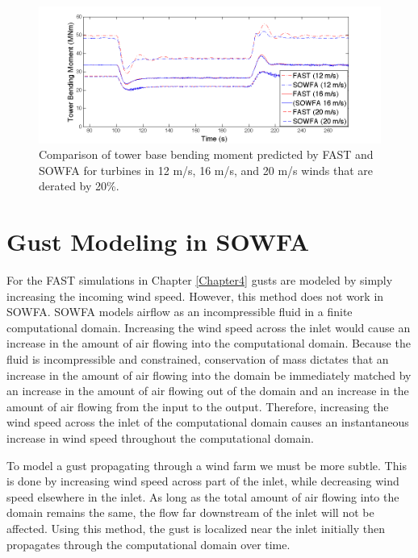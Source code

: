 \begin{figure}[htb]	
	\centering
		\includegraphics[width = .95\linewidth]{Figures/ch6Figures/fig6-6.png}

	\caption{Comparison of tower base bending moment predicted by FAST and SOWFA for turbines in 12 m/s, 16 m/s, and 20 m/s  winds that are derated by 20\%.}
	\label{fig6-6}
\end{figure}


\section{Gust Modeling in SOWFA} \label{section6-5}

For the FAST simulations in Chapter \ref{Chapter4} gusts are modeled by simply increasing the incoming wind speed. However, this method does not work in SOWFA. SOWFA models airflow as an incompressible fluid in a finite computational domain. Increasing the wind speed across the inlet would cause an increase in the amount of air flowing into the computational domain. Because the fluid is incompressible and constrained, conservation of mass dictates that an increase in the amount of air flowing into the domain be immediately matched by an increase in the amount of air flowing out of the domain and an increase in the amount of air flowing from the input to the output. Therefore, increasing the wind speed across the inlet of the computational domain causes an instantaneous increase in wind speed throughout the computational domain.

To model a gust propagating through a wind farm we must be more subtle. This is done by increasing wind speed across part of the inlet, while decreasing wind speed elsewhere in the inlet. As long as the total amount of air flowing into the domain remains the same, the flow far downstream of the inlet will not be affected. Using this method, the gust is localized near the inlet initially then propagates through the computational domain over time. 

